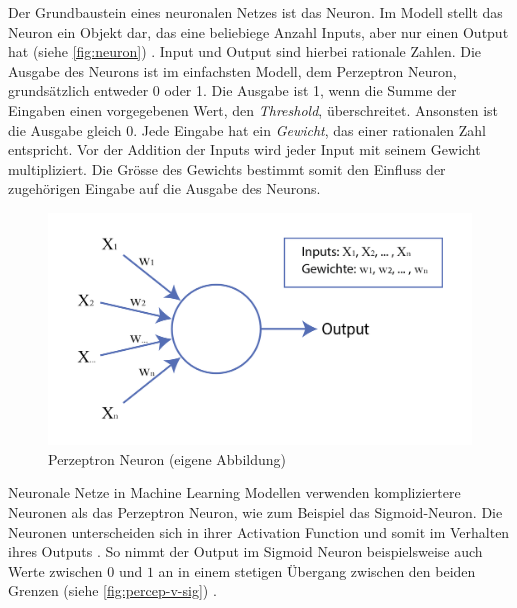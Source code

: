 Der Grundbaustein eines neuronalen Netzes ist das Neuron. Im Modell stellt das
Neuron ein Objekt dar, das eine beliebiege Anzahl Inputs, aber nur einen Output
hat (siehe \autoref{fig:neuron}) \cite{pramoditha_concept_2021}. Input und Output
sind hierbei rationale Zahlen. Die Ausgabe des Neurons ist im einfachsten
Modell, dem Perzeptron Neuron, grundsätzlich entweder 0 oder 1. Die Ausgabe ist
1, wenn die Summe der Eingaben einen vorgegebenen Wert, den \emph{Threshold},
überschreitet. Ansonsten ist die Ausgabe gleich 0. Jede Eingabe hat ein
\emph{Gewicht}, das einer rationalen Zahl entspricht. Vor der Addition der
Inputs wird jeder Input mit seinem Gewicht multipliziert.  Die Grösse des
Gewichts bestimmt somit den Einfluss der zugehörigen Eingabe auf die Ausgabe des
Neurons. \cite{nielsen_neural_2015}\cite{simplilearn_what_2021}

\begin{figure}[!ht]
    \centering
    \includegraphics[width=\textwidth]{images/theorie/neuron.png}
    \caption{Perzeptron Neuron (eigene Abbildung)}
    \label{fig:neuron}
\end{figure}

Neuronale Netze in Machine Learning Modellen verwenden kompliziertere Neuronen
als das Perzeptron Neuron, wie zum Beispiel das Sigmoid-Neuron. Die Neuronen
unterscheiden sich in ihrer Activation Function und somit im Verhalten ihres
Outputs \cite{pragati_baheti_activation_2022}. So nimmt der Output im Sigmoid Neuron
beispielsweise auch Werte zwischen $0$ und $1$ an in einem stetigen Übergang
zwischen den beiden Grenzen (siehe \autoref{fig:percep-v-sig}) \cite{kumar_sigmoid_2019}.

